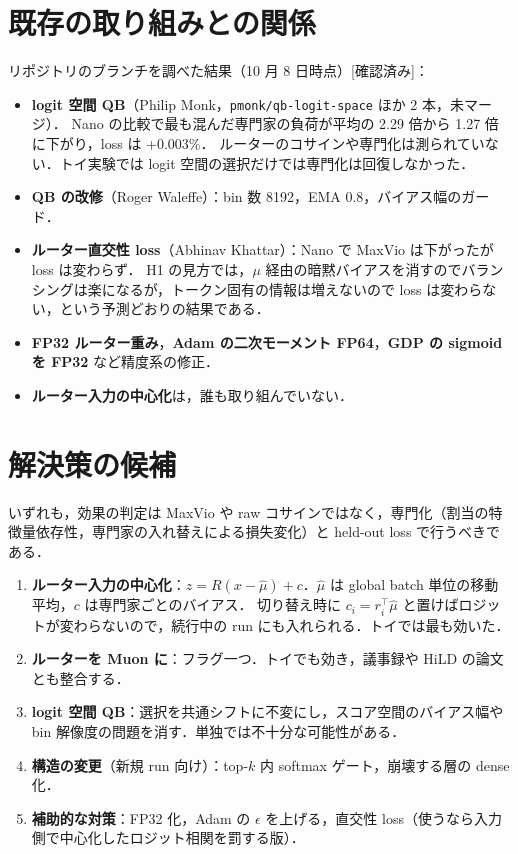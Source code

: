 \documentclass[a4paper,11pt]{ltjsarticle}
\theoremstyle{definition}
\theoremstyle{plain}
\newcommand{\T}{^{\top}}
\newcommand{\Ver}{\textsf{\textcolor{cG}{[確認済み]}}}
\begin{document}
\section{既存の取り組みとの関係}
リポジトリのブランチを調べた結果（10 月 8 日時点）\Ver：
\begin{itemize}[leftmargin=*]
\item \textbf{logit 空間 QB}（Philip Monk，\texttt{pmonk/qb-logit-space} ほか 2 本，未マージ）．
  Nano の比較で最も混んだ専門家の負荷が平均の 2.29 倍から 1.27 倍に下がり，loss は +0.003\%．
  ルーターのコサインや専門化は測られていない．トイ実験では logit 空間の選択だけでは専門化は回復しなかった．
\item \textbf{QB の改修}（Roger Waleffe）：bin 数 8192，EMA 0.8，バイアス幅のガード．
\item \textbf{ルーター直交性 loss}（Abhinav Khattar）：Nano で MaxVio は下がったが loss は変わらず．
  H1 の見方では，$\mu$ 経由の暗黙バイアスを消すのでバランシングは楽になるが，トークン固有の情報は増えないので loss は変わらない，という予測どおりの結果である．
\item \textbf{FP32 ルーター重み}，\textbf{Adam の二次モーメント FP64}，\textbf{GDP の sigmoid を FP32} など精度系の修正．
\item \textbf{ルーター入力の中心化}は，誰も取り組んでいない．
\end{itemize}

\section{解決策の候補}
いずれも，効果の判定は MaxVio や raw コサインではなく，専門化（割当の特徴量依存性，専門家の入れ替えによる損失変化）と held-out loss で行うべきである．
\begin{enumerate}[leftmargin=*]
\item \textbf{ルーター入力の中心化}：$z=R(x-\hat\mu)+c$．$\hat\mu$ は global batch 単位の移動平均，$c$ は専門家ごとのバイアス．
  切り替え時に $c_i=r_i\T\hat\mu$ と置けばロジットが変わらないので，続行中の run にも入れられる．トイでは最も効いた．
\item \textbf{ルーターを Muon に}：フラグ一つ．トイでも効き，議事録や HiLD の論文とも整合する．
\item \textbf{logit 空間 QB}：選択を共通シフトに不変にし，スコア空間のバイアス幅や bin 解像度の問題を消す．単独では不十分な可能性がある．
\item \textbf{構造の変更}（新規 run 向け）：top-$k$ 内 softmax ゲート，崩壊する層の dense 化．
\item \textbf{補助的な対策}：FP32 化，Adam の $\epsilon$ を上げる，直交性 loss（使うなら入力側で中心化したロジット相関を罰する版）．
\end{enumerate}
\end{document}
